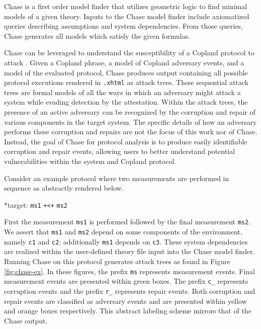 \documentclass[runningheads]{llncs}
\theoremstyle{definition}
\begin{document}
Chase \cite{Ramsdell:2020:Chase,Rowe:2021:AutomatedTrust} is a first order model finder that utilizes geometric logic\cite{Enderton:logic} to find minimal models of a given theory. Inputs to the Chase model finder include axiomatized queries describing assumptions and system dependencies. From those queries, Chase generates all models which satisfy the given formulas. 


Chase can be leveraged to understand the susceptibility of a Copland protocol to attack \cite{Rowe:2021:AutomatedTrust}. Given a Copland phrase, a model of Copland adversary events, and a model of the evaluated protocol, Chase produces output containing all possible protocol executions rendered in \texttt{.xhtml} as attack trees. These sequential attack trees \cite{Horne:Attack, Jhaware:attack} are formal models of all the ways in which an adversary might attack a system while evading detection by the attestation. Within the attack trees, the presence of an active adversary can be recognized by the corruption and repair of various components in the target system. The specific details of how an adversary performs these corruption and repairs are not the focus of this work nor of Chase. Instead, the goal of Chase for protocol analysis is to produce easily identifiable corruption and repair events, allowing users to better understand potential vulnerabilities within the system and Copland protocol. 

Consider an example protocol where two measurements are performed in sequence as abstractly rendered below.

\begin{center}
    *target: \texttt{ms1} \texttt{+<+} \texttt{ms2}
\end{center}

\noindent First the measurement \texttt{ms1} is performed followed by the final measurement \texttt{ms2}. We assert that \texttt{ms1} and \texttt{ms2} depend on some components of the environment, namely \texttt{c1} and \texttt{c2}; additionally \texttt{ms1} depends on \texttt{c3}. These system dependencies are realized within the user-defined theory file input into the Chase model finder. Running Chase on this protocol generates attack trees as found in Figure \ref{fig:chase-ex}. In these figures, the prefix \texttt{ms} represents measurement events. Final measurement events are presented within green boxes. The prefix \texttt{c\_} represents corruption events and the prefix \texttt{r\_} represents repair events. Both corruption and repair events are classified as adversary events and are presented within yellow and orange boxes respectively. This abstract labeling scheme mirrors that of the Chase output.
\end{document}
